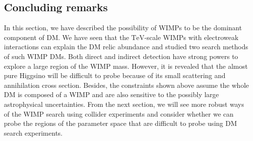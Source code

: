 \documentclass[12pt,twoside,book]{article}
\begin{document}
\subsection{Concluding remarks}
\label{sec:summary_DM}

In this section, we have described the possibility of WIMPs to be the dominant component of DM.
We have seen that the $\mathrm{TeV}$-scale WIMPs with electroweak interactions can explain the DM relic abundance and studied two search methods of such WIMP DMs.
Both direct and indirect detection have strong powers to explore a large region of the WIMP mass.
However, it is revealed that the almost pure Higgsino will be difficult to probe because of its small scattering and annihilation cross section.
Besides, the constraints shown above assume the whole DM is composed of a WIMP and are also sensitive to the possibly large astrophysical uncertainties.
From the next section, we will see more robust ways of the WIMP search using collider experiments and consider whether we can probe the regions of the parameter space that are difficult to probe using DM search experiments.


% 
% 
\end{document}
